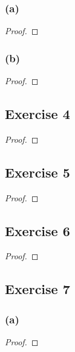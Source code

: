 \documentclass[14pt]{extarticle}
\begin{document}
\subsubsection{(a)}

\begin{proof}

\end{proof}

\subsubsection{(b)}

\begin{proof}

\end{proof}

\subsection{Exercise 4}

\begin{proof}

\end{proof}

\subsection{Exercise 5}

\begin{proof}

\end{proof}

\subsection{Exercise 6}

\begin{proof}

\end{proof}

\subsection{Exercise 7}

\subsubsection{(a)}

\begin{proof}

\end{proof}
\end{document}
